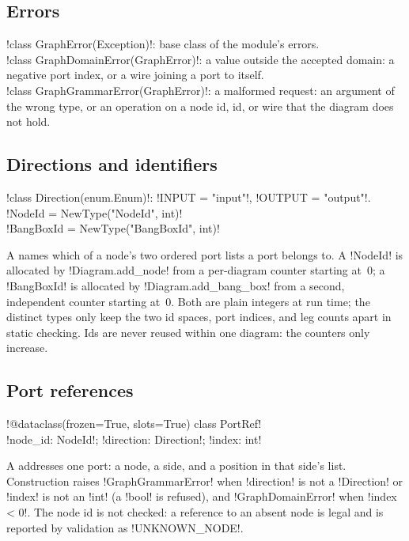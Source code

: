 \subsection{Errors}

\begin{signature}
\py!class GraphError(Exception)!: base class of the module's errors.\\
\py!class GraphDomainError(GraphError)!: a value outside the accepted domain: a negative port index, or a wire joining a port to itself.\\
\py!class GraphGrammarError(GraphError)!: a malformed request: an argument of the wrong type, or an operation on a node id, \bbox{} id, or wire that the diagram does not hold.
\end{signature}

\subsection{Directions and identifiers}

\begin{signature}
\py!class Direction(enum.Enum)!: \py!INPUT = "input"!, \py!OUTPUT = "output"!.\\
\py!NodeId = NewType("NodeId", int)!\\
\py!BangBoxId = NewType("BangBoxId", int)!
\end{signature}

A  names which of a node's two ordered port lists a port belongs to. A \py!NodeId! is allocated by \py!Diagram.add_node! from a per-diagram counter starting at~$0$; a \py!BangBoxId! is allocated by \py!Diagram.add_bang_box! from a second, independent counter starting at~$0$. Both are plain integers at run time; the distinct types only keep the two id spaces, port indices, and leg counts apart in static checking. Ids are never reused within one diagram: the counters only increase.

\subsection{Port references}

\begin{signature}
\py!@dataclass(frozen=True, slots=True) class PortRef!\\
\quad \py!node_id: NodeId!; \py!direction: Direction!; \py!index: int!
\end{signature}

A  addresses one port: a node, a side, and a position in that side's list. Construction raises \py!GraphGrammarError! when \py!direction! is not a \py!Direction! or \py!index! is not an \py!int! (a \py!bool! is refused), and \py!GraphDomainError! when \py!index < 0!. The node id is not checked: a reference to an absent node is legal and is reported by validation as \code!UNKNOWN_NODE!.

